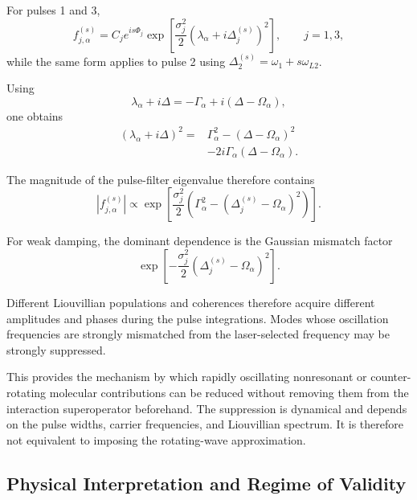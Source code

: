 \documentclass[11pt]{article}
\begin{document}
For pulses 1 and 3,
%
\begin{equation}
f_{j,\alpha}^{(s)}
=
C_j
e^{is\Phi_j}
\exp
\left[
\frac{\sigma_j^2}{2}
\left(
\lambda_\alpha
+
i\Delta_j^{(s)}
\right)^2
\right],
\qquad
j=1,3,
\end{equation}
%
while the same form applies to pulse 2 using
$\Delta_2^{(s)}=\omega_1+s\omega_{L2}$.

Using
%
\begin{equation}
\lambda_\alpha
+
i\Delta
=
-\Gamma_\alpha
+
i(\Delta-\Omega_\alpha),
\end{equation}
%
one obtains
%
\begin{align}
\left(
\lambda_\alpha+i\Delta
\right)^2
={}&
\Gamma_\alpha^2
-
(\Delta-\Omega_\alpha)^2
\nonumber\\
&-
2i\Gamma_\alpha
(\Delta-\Omega_\alpha).
\end{align}

The magnitude of the pulse-filter eigenvalue therefore contains
%
\begin{equation}
\boxed{
|f_{j,\alpha}^{(s)}|
\propto
\exp
\left[
\frac{\sigma_j^2}{2}
\left(
\Gamma_\alpha^2
-
(\Delta_j^{(s)}-\Omega_\alpha)^2
\right)
\right].
}
\label{eq:F_mode_amplitude}
\end{equation}

For weak damping, the dominant dependence is the Gaussian mismatch
factor
%
\begin{equation}
\exp
\left[
-\frac{\sigma_j^2}{2}
(\Delta_j^{(s)}-\Omega_\alpha)^2
\right].
\end{equation}

Different Liouvillian populations and coherences therefore acquire
different amplitudes and phases during the pulse integrations. Modes
whose oscillation frequencies are strongly mismatched from the
laser-selected frequency may be strongly suppressed.

This provides the mechanism by which rapidly oscillating nonresonant
or counter-rotating molecular contributions can be reduced without
removing them from the interaction superoperator beforehand. The
suppression is dynamical and depends on the pulse widths, carrier
frequencies, and Liouvillian spectrum. It is therefore not equivalent
to imposing the rotating-wave approximation.


\subsection{Physical Interpretation and Regime of Validity}
\label{subsec:finite_validity}
\end{document}
